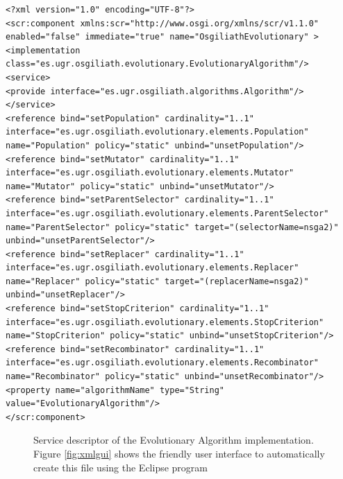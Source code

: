 \newsavebox{\mintedboxDS}
\begin{lrbox}{\mintedboxDS}
\begin{minipage}{10cm}
\begin{verbatim}
<?xml version="1.0" encoding="UTF-8"?>
<scr:component xmlns:scr="http://www.osgi.org/xmlns/scr/v1.1.0" 
enabled="false" immediate="true" name="OsgiliathEvolutionary" >
<implementation 
class="es.ugr.osgiliath.evolutionary.EvolutionaryAlgorithm"/>
<service>
<provide interface="es.ugr.osgiliath.algorithms.Algorithm"/>
</service>
<reference bind="setPopulation" cardinality="1..1"
interface="es.ugr.osgiliath.evolutionary.elements.Population"
name="Population" policy="static" unbind="unsetPopulation"/>
<reference bind="setMutator" cardinality="1..1"
interface="es.ugr.osgiliath.evolutionary.elements.Mutator"
name="Mutator" policy="static" unbind="unsetMutator"/>
<reference bind="setParentSelector" cardinality="1..1"
interface="es.ugr.osgiliath.evolutionary.elements.ParentSelector"
name="ParentSelector" policy="static" target="(selectorName=nsga2)" 
unbind="unsetParentSelector"/>
<reference bind="setReplacer" cardinality="1..1"
interface="es.ugr.osgiliath.evolutionary.elements.Replacer"
name="Replacer" policy="static" target="(replacerName=nsga2)" 
unbind="unsetReplacer"/>
<reference bind="setStopCriterion" cardinality="1..1"
interface="es.ugr.osgiliath.evolutionary.elements.StopCriterion"
name="StopCriterion" policy="static" unbind="unsetStopCriterion"/>
<reference bind="setRecombinator" cardinality="1..1"
interface="es.ugr.osgiliath.evolutionary.elements.Recombinator"
name="Recombinator" policy="static" unbind="unsetRecombinator"/>
<property name="algorithmName" type="String" 
value="EvolutionaryAlgorithm"/>
</scr:component>
\end{verbatim}
\end{minipage}
\end{lrbox} %

\begin{figure}
\usebox{\mintedboxDS}
\caption{Service descriptor of the Evolutionary Algorithm implementation.  Figure \ref{fig:xmlgui} shows the friendly user interface to automatically create this file using the Eclipse program} 
\label{fig:dsevo} 
\end{figure}

